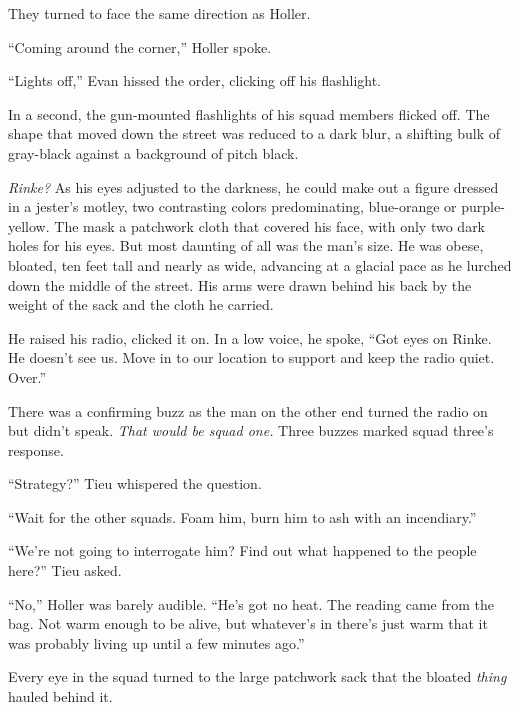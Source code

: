They turned to face the same direction as Holler.



``Coming around the corner,'' Holler spoke.



``Lights off,'' Evan hissed the order, clicking off his flashlight.



In a second, the gun-mounted flashlights of his squad members flicked off.  The shape that moved down the street was reduced to a dark blur, a shifting bulk of gray-black against a background of pitch black.



\emph{Rinke?}  As his eyes adjusted to the darkness, he could make out a figure dressed in a jester's motley, two contrasting colors predominating, blue-orange or purple-yellow.  The mask a patchwork cloth that covered his face, with only two dark holes for his eyes.  But most daunting of all was the man's size.  He was obese, bloated, ten feet tall and nearly as wide, advancing at a glacial pace as he lurched down the middle of the street.  His arms were drawn behind his back by the weight of the sack and the cloth he carried.



He raised his radio, clicked it on.  In a low voice, he spoke, ``Got eyes on Rinke.  He doesn't see us.  Move in to our location to support and keep the radio quiet.  Over.''



There was a confirming buzz as the man on the other end turned the radio on but didn't speak.  \emph{That would be squad one.}  Three buzzes marked squad three's response.



``Strategy?''  Tieu whispered the question.



``Wait for the other squads.  Foam him, burn him to ash with an incendiary.''



``We're not going to interrogate him?  Find out what happened to the people here?''  Tieu asked.



``No,'' Holler was barely audible.  ``He's got no heat.  The reading came from the bag.  Not warm enough to be alive, but whatever's in there's just warm that it was probably living up until a few minutes ago.''



Every eye in the squad turned to the large patchwork sack that the bloated \emph{thing }hauled behind it.




